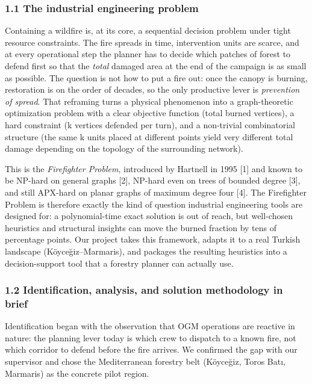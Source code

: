 \documentclass[
  11pt,
]{article}
\begin{document}
\subsubsection{1.1 The industrial engineering
problem}\label{the-industrial-engineering-problem}

Containing a wildfire is, at its core, a sequential decision problem
under tight resource constraints. The fire spreads in time, intervention
units are scarce, and at every operational step the planner has to
decide which patches of forest to defend first so that the \emph{total}
damaged area at the end of the campaign is as small as possible. The
question is not how to put a fire out: once the canopy is burning,
restoration is on the order of decades, so the only productive lever is
\emph{prevention of spread}. That reframing turns a physical phenomenon
into a graph-theoretic optimization problem with a clear objective
function (total burned vertices), a hard constraint (k vertices defended
per turn), and a non-trivial combinatorial structure (the same k units
placed at different points yield very different total damage depending
on the topology of the surrounding network).

This is the \emph{Firefighter Problem}, introduced by Hartnell in 1995
{[}1{]} and known to be NP-hard on general graphs {[}2{]}, NP-hard even
on trees of bounded degree {[}3{]}, and still APX-hard on planar graphs
of maximum degree four {[}4{]}. The Firefighter Problem is therefore
exactly the kind of question industrial engineering tools are designed
for: a polynomial-time exact solution is out of reach, but well-chosen
heuristics and structural insights can move the burned fraction by tens
of percentage points. Our project takes this framework, adapts it to a
real Turkish landscape (Köyceğiz--Marmaris), and packages the resulting
heuristics into a decision-support tool that a forestry planner can
actually use.

\subsubsection{1.2 Identification, analysis, and solution methodology in
brief}\label{identification-analysis-and-solution-methodology-in-brief}

Identification began with the observation that OGM operations are
reactive in nature: the planning lever today is which crew to dispatch
to a known fire, not which corridor to defend before the fire arrives.
We confirmed the gap with our supervisor and chose the Mediterranean
forestry belt (Köyceğiz, Toros Batı, Marmaris) as the concrete pilot
region.
\end{document}
